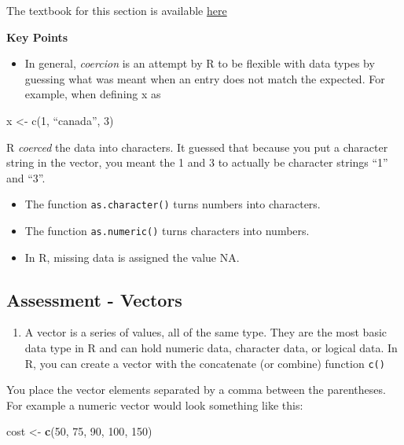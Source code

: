 \documentclass[]{article}
\newenvironment{Shaded}{\begin{snugshade}}{\end{snugshade}}
\newcommand{\DecValTok}[1]{\textcolor[rgb]{0.00,0.00,0.81}{#1}}
\newcommand{\KeywordTok}[1]{\textcolor[rgb]{0.13,0.29,0.53}{\textbf{#1}}}
\newcommand{\NormalTok}[1]{#1}
\newcommand{\StringTok}[1]{\textcolor[rgb]{0.31,0.60,0.02}{#1}}
\providecommand{\tightlist}{%
  \setlength{\itemsep}{0pt}\setlength{\parskip}{0pt}}
\begin{document}
The textbook for this section is available
\href{https://rafalab.github.io/dsbook/r-basics.html\#coercion}{here}

\textbf{Key Points}

\begin{itemize}
\tightlist
\item
  In general, \emph{coercion} is an attempt by R to be flexible with
  data types by guessing what was meant when an entry does not match the
  expected. For example, when defining x as
\end{itemize}

x \textless{}- c(1, ``canada'', 3)

R \emph{coerced} the data into characters. It guessed that because you
put a character string in the vector, you meant the 1 and 3 to actually
be character strings ``1'' and ``3''.

\begin{itemize}
\tightlist
\item
  The function \texttt{as.character()} turns numbers into characters.
\item
  The function \texttt{as.numeric()} turns characters into numbers.
\item
  In R, missing data is assigned the value NA.
\end{itemize}

\hypertarget{assessment---vectors}{%
\subsection{Assessment - Vectors}\label{assessment---vectors}}

\begin{enumerate}
\def\labelenumi{\arabic{enumi}.}
\tightlist
\item
  A vector is a series of values, all of the same type. They are the
  most basic data type in R and can hold numeric data, character data,
  or logical data. In R, you can create a vector with the concatenate
  (or combine) function \texttt{c()}
\end{enumerate}

You place the vector elements separated by a comma between the
parentheses. For example a numeric vector would look something like
this:

\begin{Shaded}
\begin{Highlighting}[]
\NormalTok{cost <-}\StringTok{ }\KeywordTok{c}\NormalTok{(}\DecValTok{50}\NormalTok{, }\DecValTok{75}\NormalTok{, }\DecValTok{90}\NormalTok{, }\DecValTok{100}\NormalTok{, }\DecValTok{150}\NormalTok{)}
\end{Highlighting}
\end{Shaded}
\end{document}

